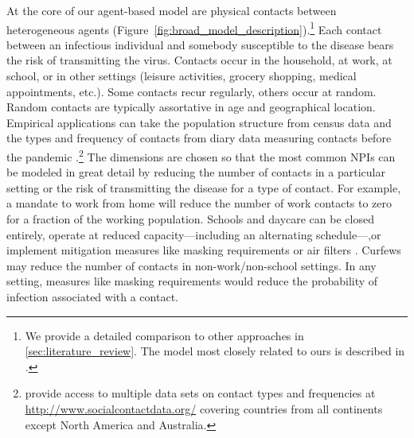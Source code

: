 At the core of our agent-based model are physical contacts between heterogeneous agents
(Figure~\ref{fig:broad_model_description}).\footnote{We provide a detailed comparison to
other approaches in \ref{sec:literature_review}. The model most closely related to ours
is described in \citet{Hinch2020}.} Each contact between an infectious individual and
somebody susceptible to the disease bears the risk of transmitting the virus. Contacts
occur in the household, at work, at school, or in other settings (leisure activities,
grocery shopping, medical appointments, etc.). Some contacts recur regularly, others
occur at random. Random contacts are typically assortative in age and geographical
location. Empirical applications can take the population structure from census data and
the types and frequency of contacts from diary data measuring contacts before the
pandemic \citep[e.g.][]{Mossong2008}.\footnote{\citet{Hoang2019} provide access to
multiple data sets on contact types and frequencies at
\url{http://www.socialcontactdata.org/} covering countries from all continents except
North America and Australia.} The dimensions are chosen so that the most common NPIs can
be modeled in great detail by reducing the number of contacts in a particular setting or
the risk of transmitting the disease for a type of contact. For example, a mandate to
work from home will reduce the number of work contacts to zero for a fraction of the
working population. Schools and daycare can be closed entirely, operate at reduced
capacity---including an alternating schedule---,or implement mitigation measures like
masking requirements or air filters \citep{Lessler2021}. Curfews may reduce the number
of contacts in non-work/non-school settings. In any setting, measures like masking
requirements would reduce the probability of infection associated with a contact.

